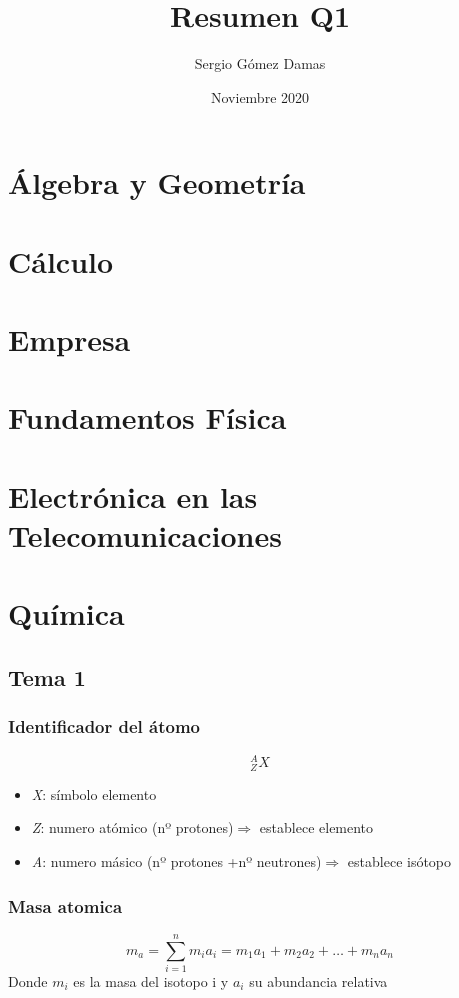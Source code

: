 \documentclass[a4paper,12pt]{article}
\title{Resumen Q1}
\author{Sergio Gómez Damas}
\date{Noviembre 2020}
\begin{document}
\maketitle
\newpage
\tableofcontents
\newpage
\section{Álgebra y Geometría}
\newpage
\section{Cálculo}
\newpage
\section{Empresa}
\newpage
\section{Fundamentos Física}
\newpage
\section{Electrónica en las Telecomunicaciones}
\newpage
\section{Química}
\subsection{Tema 1}
\subsubsection{Identificador del átomo}
\begin{equation}
    ^A_Z X
\end{equation}
\begin{itemize}
    \item \emph{X}: símbolo elemento
    \item \emph{Z}: numero atómico (nº protones)$\Rightarrow$ establece elemento
    \item \emph{A}: numero másico (nº protones +nº neutrones)$\Rightarrow$ establece isótopo
\end{itemize}
\subsubsection{Masa atomica}
\begin{equation}
    m_a=\sum^{n}_{i=1}m_ia_i=m_1a_1+m_2a_2+\dots+m_na_n
\end{equation}
Donde $m_i$ es la masa del isotopo i y $a_i$ su abundancia relativa
\end{document}
